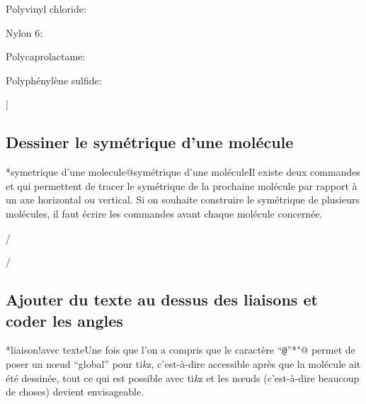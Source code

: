 \documentclass[10pt]{article}
\makeatletter
\newcommand\idx{\@ifstar{\let\print@or@not\@gobble\idx@}{\let\print@or@not\@firstofone\idx@}}
\newcommand\idx@[1]{%
	\ifcat\expandafter\noexpand\@car#1\@nil\relax%
		\expandafter\ifx\@car#1\@nil\protect
			\index{#1}%
			\print@or@not{#1}%
		\else
			\saveexpandmode\expandarg
			\StrSubstitute{\string#1}{\string @}{\@empty\protect\symbol{'100}}[\temp@]%
			\StrGobbleLeft\temp@1[\temp@]%
			\restoreexpandmode
			\expandafter\index\expandafter{\temp@ @\protect\texttt{\protect\textbackslash\temp@}}%
			\print@or@not{\texttt{\string#1}}%
		\fi
	\else
		\index{#1}%
		\print@or@not{#1}%
	\fi
}
\newcommand\make@car@active[2]{%
	\catcode`#1\active
	\begingroup
		\lccode`\~`#1\relax
		\lowercase{\endgroup\def~{#2}}%
}
\newif\if@exstar
\newcommand\exemple{%
	\begingroup
	\parskip\z@
	\@makeother\;\@makeother\!\@makeother\?\@makeother\:%
	\@ifstar{\@exstartrue\exemple@}{\@exstarfalse\exemple@}}
\newcommand\exemple@[2][65]{%
	\medbreak\noindent
	\begingroup
		\let\do\@makeother\dospecials
		\make@car@active\ { {}}%
		\make@car@active\^^M{\par\leavevmode}%
		\make@car@active\,{\leavevmode\kern\z@\string,}%
		\make@car@active\-{\leavevmode\kern\z@\string-}%
		\make@car@active\>{\leavevmode\kern\z@\string>}%
		\make@car@active\<{\leavevmode\kern\z@\string<}%
		\exemple@@{#1}{#2}%
}
\newcommand\exemple@@[3]{%
	\def\@tempa##1#3{\exemple@@@{#1}{#2}{##1}}%
	\@tempa
}
\newcommand\exemple@@@[3]{%
	\xdef\the@code{#3}%
	\endgroup
	\if@exstar
		\begingroup
			\fboxrule0.4pt
			\let\breakboxparindent\z@
			\def\bkvz@bottom{\hrule\@height\fboxrule}%
			\let\bkvz@before@breakbox\relax
			\def\bkvz@set@linewidth{\advance\linewidth\dimexpr-2\fboxrule-2\fboxsep}%
			\def\bkvz@left{\vrule\@width\fboxrule\hskip\fboxsep}%
			\def\bkvz@right{\hskip\fboxsep\vrule\@width\fboxrule}%
			\def\bkvz@top{\hbox to \hsize{%
				\vrule\@width\fboxrule\@height\fboxrule
				\leaders\bkvz@bottom\hfill
				\ECFAugie
				\fboxsep\z@
				\colorbox{black}{\kern0.25em\color{white}\footnotesize\lower0.5ex\hbox{\strut#2}\kern0.25em}%
				\leaders\bkvz@bottom\hfill
				\vrule\@width\fboxrule\@height\fboxrule}}%
			\breakbox
				\kern.5ex\relax
				\ttfamily\footnotesize\the@code\par
				\normalfont
				\kern3pt
				\hrule height0.1pt width\linewidth depth0.1pt
				\vskip5pt
				\rightskip0pt plus 1fill
				\everypar{{\color{lightgray}\rlap{\vrule height0.1pt width\linewidth depth0.1pt}}\hskip0pt plus 1fill}%
				\newlinechar`\^^M\everyeof{\noexpand}\scantokens{#3}\par
			\endbreakbox
		\endgroup
	\else
		\vskip0.5ex
		\boxput*(0,1)
			{\fboxsep\z@
			\hbox{\ECFAugie\colorbox{black}{\leavevmode\kern0.25em{\color{white}\footnotesize\strut#2}\kern0.25em}}%
			}%
			{\fboxsep5pt
			\fbox{%
				$\vcenter{\hsize\dimexpr0.#1\linewidth-\fboxsep-\fboxrule\relax
					\kern5pt\parskip0pt \ttfamily\footnotesize\the@code}%
				\vcenter{\kern5pt\hsize\dimexpr\linewidth-0.#1\linewidth-\fboxsep-\fboxrule\relax
					\everypar{{\color{lightgray}\rlap{\vrule height0.1pt width\dimexpr\linewidth-0.#1\linewidth-\fboxsep-\fboxrule depth0.1pt}}}%
					\footnotesize\newlinechar`\^^M\everyeof{\noexpand}\scantokens{#3}}$%
				}%
			}%
	\fi
	\medbreak
	\endgroup
}
\let\do\@makeother\dospecials
\newcommand\TIKZ{ti\textit kz\xspace}
\makeatother
\begin{document}
Polyvinyl chloride:
\bigskip

Nylon 6:
\bigskip

Polycaprolactame:\setatomsep{2em}
\bigskip

\setpolymerdelim[]
Polyphénylène sulfide:
\bigskip

|

\subsection{Dessiner le symétrique d'une molécule}\label{retournement}
\idx*{symetrique d'une molecule@symétrique d'une molécule}Il existe deux commandes \idx{\hflipnext} et \idx{\vflipnext} qui permettent de tracer le symétrique de la prochaine molécule par rapport à un axe horizontal ou vertical. Si on souhaite construire le symétrique de plusieurs molécules, il faut écrire les commandes avant chaque molécule concernée.

\exemple{Symétriques}/%

\vflipnext%
\medskip

\hflipnext%
/

\subsection{Ajouter du texte au dessus des liaisons et coder les angles}
\idx*{liaison!avec texte}Une fois que l'on a compris que le caractère ``\verb-@-''\idx*{"@} permet de poser un nœud ``global'' pour \TIKZ, c'est-à-dire accessible après que la molécule ait été dessinée, tout ce qui est possible avec \TIKZ et les nœuds (c'est-à-dire beaucoup de choses) devient envisageable.
\end{document}
